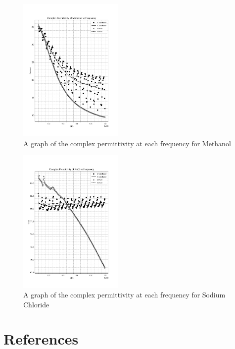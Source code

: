 \documentclass[12pt, a4paper]{article}
\begin{document}
\begin{multicols*}{2}
\begin{figure}[H]
    \centering
    \includegraphics[width = 0.45\textwidth]{Plot1.png}\caption{A graph of the complex permittivity at each frequency for Methanol}\label{fig: Methanol Graph}
\end{figure}

\begin{figure}[H]
    \centering
    \includegraphics[width = 0.45\textwidth]{Plot2.png}\caption{A graph of the complex permittivity at each frequency for Sodium Chloride}\label{fig: NaCl Graph}
\end{figure}

\end{multicols*}

\section{References}
\printbibliography[heading = none]
\end{document}
